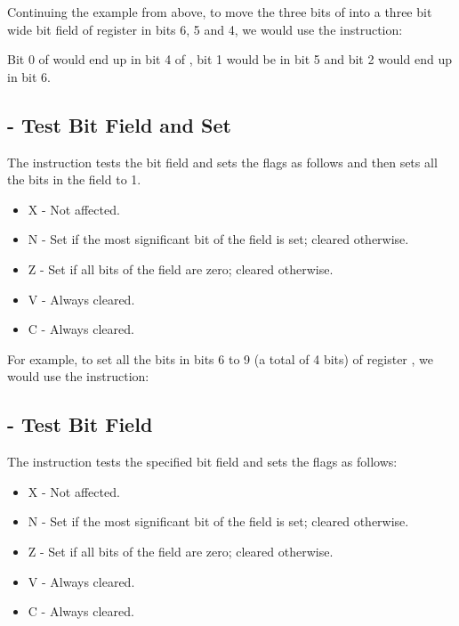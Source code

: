 Continuing the example from above, to move the three bits of  into a three bit wide bit field of register  in bits 6, 5 and 4, we would use the instruction:


Bit 0 of  would end up in bit 4 of , bit 1 would be in bit 5 and bit 2 would end up in bit 6.

\subsection{ - Test Bit Field and Set}

The  instruction tests the bit field and sets the flags as follows and then sets all the bits in the field to 1.

\begin{itemize}
    \item X - Not affected.
    \item N - Set if the most significant bit of the field is set; cleared otherwise.
    \item Z - Set if all bits of the field are zero; cleared otherwise.
    \item V - Always cleared.
    \item C - Always cleared.
\end{itemize}

For example, to set all the bits in bits 6 to 9 (a total of 4 bits) of register , we would use the instruction:


\subsection{ - Test Bit Field}\label{chp-mc68020-bftst}

The  instruction tests the specified bit field and sets the flags as follows:

\begin{itemize}
    \item X - Not affected.
    \item N - Set if the most significant bit of the field is set; cleared otherwise.
    \item Z - Set if all bits of the field are zero; cleared otherwise.
    \item V - Always cleared.
    \item C - Always cleared.
\end{itemize}


